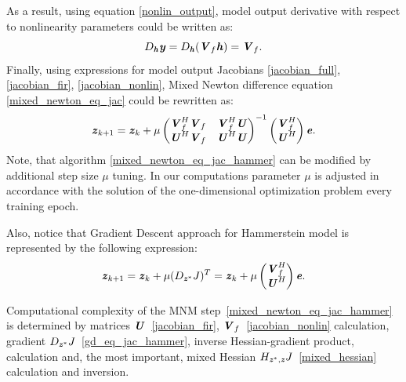 \documentclass[12pt]{article}
\newcommand{\bit}[1]{\ensuremath{\textbf{\textit{#1}}}}
\begin{document}
As a result, using equation \eqref{nonlin_output}, model output derivative with respect to nonlinearity parameters could be written as:
\begin{equation}
    D_{\bit{h}}\bit{y}=D_{\bit{h}}(\bit{V}_f\bit{h})=\bit{V}_f.
    \label{jacobian_nonlin}
\end{equation}
Finally, using expressions for model output Jacobians \eqref{jacobian_full}, \eqref{jacobian_fir}, \eqref{jacobian_nonlin}, Mixed Newton difference equation \eqref{mixed_newton_eq_jac} could be rewritten as:
\begin{equation}
    \bit{z}_{k+1}=\bit{z}_k+\mu\begin{pmatrix}
        \bit{V}_f^H\bit{V}_f & \bit{V}_f^H\bit{U} \\
        \bit{U}^H\bit{V}_f & \bit{U}^H\bit{U}
    \end{pmatrix}^{-1}\begin{pmatrix}
        \bit{V}_f^H \\
        \bit{U}^H
    \end{pmatrix}\bit{e}.
    \label{mixed_newton_eq_jac_hammer}
\end{equation}
Note, that algorithm \eqref{mixed_newton_eq_jac_hammer} can be modified by additional step size $\mu$ tuning. In our computations parameter $\mu$ is adjusted in accordance with the solution of the one-dimensional optimization problem every training epoch.

Also, notice that Gradient Descent approach for Hammerstein model is represented by the following expression:
\begin{equation}
    \bit{z}_{k+1}=\bit{z}_k+\mu (D_{\bit{z}^*}J)^T=
    \bit{z}_k+\mu\begin{pmatrix}
        \bit{V}_f^H \\
        \bit{U}^H
    \end{pmatrix}\bit{e}.
    \label{gd_eq_jac_hammer}
\end{equation}



Computational complexity of the MNM step~\eqref{mixed_newton_eq_jac_hammer} is determined by matrices $\bit{U}$~\eqref{jacobian_fir}, $\bit{V}_f$~\eqref{jacobian_nonlin} calculation, gradient $D_{\bit{z}^*}J$~\eqref{gd_eq_jac_hammer}, inverse Hessian-gradient product, calculation and, the most important, mixed Hessian $H_{\bit{z}^*, \bit{z}}J$~\eqref{mixed_hessian} calculation and inversion.
\end{document}
